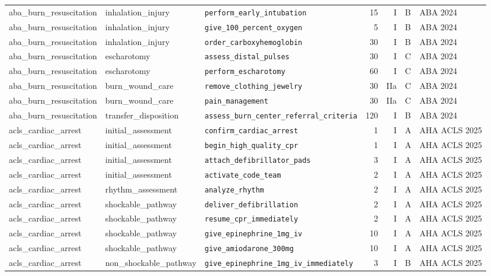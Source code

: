 \begin{longtable}{lllrrll}
aba\_burn\_resuscitation & inhalation\_injury & \texttt{perform\_early\_intubation} & 15 & I & B & ABA 2024 \\
aba\_burn\_resuscitation & inhalation\_injury & \texttt{give\_100\_percent\_oxygen} & 5 & I & B & ABA 2024 \\
aba\_burn\_resuscitation & inhalation\_injury & \texttt{order\_carboxyhemoglobin} & 30 & I & B & ABA 2024 \\
aba\_burn\_resuscitation & escharotomy & \texttt{assess\_distal\_pulses} & 30 & I & C & ABA 2024 \\
aba\_burn\_resuscitation & escharotomy & \texttt{perform\_escharotomy} & 60 & I & C & ABA 2024 \\
aba\_burn\_resuscitation & burn\_wound\_care & \texttt{remove\_clothing\_jewelry} & 30 & IIa & C & ABA 2024 \\
aba\_burn\_resuscitation & burn\_wound\_care & \texttt{pain\_management} & 30 & IIa & C & ABA 2024 \\
aba\_burn\_resuscitation & transfer\_disposition & \texttt{assess\_burn\_center\_referral\_criteria} & 120 & I & B & ABA 2024 \\
acls\_cardiac\_arrest & initial\_assessment & \texttt{confirm\_cardiac\_arrest} & 1 & I & A & AHA ACLS 2025 \\
acls\_cardiac\_arrest & initial\_assessment & \texttt{begin\_high\_quality\_cpr} & 1 & I & A & AHA ACLS 2025 \\
acls\_cardiac\_arrest & initial\_assessment & \texttt{attach\_defibrillator\_pads} & 3 & I & A & AHA ACLS 2025 \\
acls\_cardiac\_arrest & initial\_assessment & \texttt{activate\_code\_team} & 2 & I & A & AHA ACLS 2025 \\
acls\_cardiac\_arrest & rhythm\_assessment & \texttt{analyze\_rhythm} & 2 & I & A & AHA ACLS 2025 \\
acls\_cardiac\_arrest & shockable\_pathway & \texttt{deliver\_defibrillation} & 2 & I & A & AHA ACLS 2025 \\
acls\_cardiac\_arrest & shockable\_pathway & \texttt{resume\_cpr\_immediately} & 2 & I & A & AHA ACLS 2025 \\
acls\_cardiac\_arrest & shockable\_pathway & \texttt{give\_epinephrine\_1mg\_iv} & 10 & I & A & AHA ACLS 2025 \\
acls\_cardiac\_arrest & shockable\_pathway & \texttt{give\_amiodarone\_300mg} & 10 & I & A & AHA ACLS 2025 \\
acls\_cardiac\_arrest & non\_shockable\_pathway & \texttt{give\_epinephrine\_1mg\_iv\_immediately} & 3 & I & B & AHA ACLS 2025 \\

\end{longtable}
